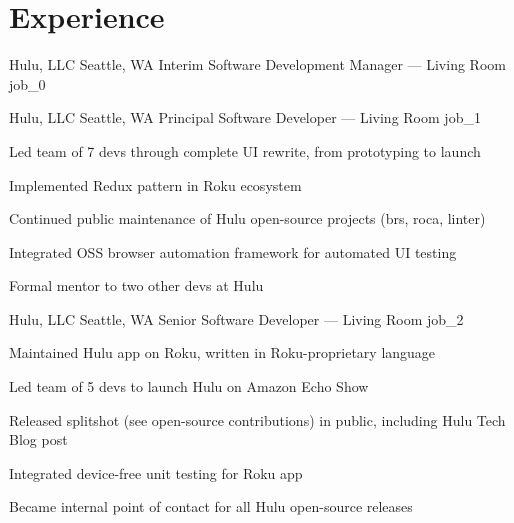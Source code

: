 \documentclass[10pt]{barag_resume}
\author{Sean Barag}
\begin{document}
\section{Experience}\relax
    \renewcommand{\labelitemi}{$\cdot$}\relax %
    \begin{job}{Hulu, LLC}
        {Seattle, WA}
        {Interim Software Development Manager --- Living Room}
        {job_0}
    \end{job}

    \begin{job}{Hulu, LLC}
        {Seattle, WA}
        {Principal Software Developer --- Living Room}
        {job_1}
            \begin{itemize*}
                \item Led team of 7 devs through complete UI rewrite, from prototyping to launch
                \item Implemented Redux pattern in Roku ecosystem
                \item Continued public maintenance of Hulu open-source projects (brs, roca, linter)
                \item Integrated OSS browser automation framework for automated UI testing
                \item Formal mentor to two other devs at Hulu
            \end{itemize*}
    \end{job}

    \begin{job}{Hulu, LLC}
        {Seattle, WA}
        {Senior Software Developer --- Living Room}
        {job_2}
            \begin{itemize*}
                \item Maintained Hulu app on Roku, written in Roku-proprietary language
                \item Led team of 5 devs to launch Hulu on Amazon Echo Show
                \item Released splitshot (see open-source contributions) in public, including Hulu Tech Blog post
                \item Integrated device-free unit testing for Roku app
                \item Became internal point of contact for all Hulu open-source releases
            \end{itemize*}
    \end{job}
\end{document}
